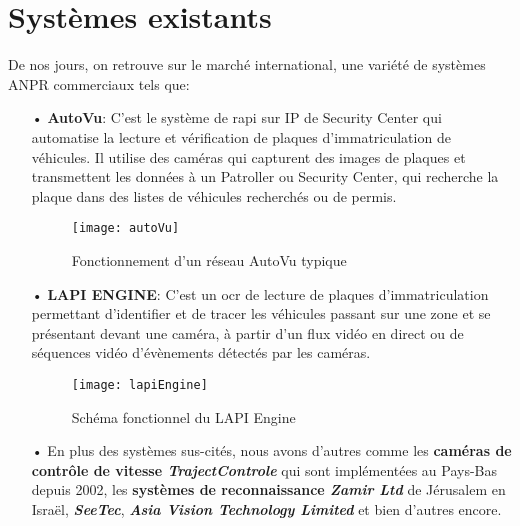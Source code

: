 \section{Systèmes existants}
De nos jours, on retrouve sur le marché international, une variété de systèmes ANPR commerciaux tels que:
    \begin{itemize}
        \item[•]\textbf{AutoVu}: C’est le système de \acrfull{rapi} sur IP de Security Center qui automatise la lecture et vérification de plaques d'immatriculation de véhicules. Il utilise des caméras qui capturent des images de plaques et transmettent les données à un Patroller ou Security Center, qui recherche la plaque dans des listes de véhicules recherchés ou de permis. \cite{autoVu}
            \begin{figure}[H]
                \centering
                \texttt{[image: autoVu]}
                \caption{Fonctionnement d'un réseau AutoVu typique}
            \end{figure}  
        \item[•]\textbf{LAPI ENGINE}: C’est un \acrshort{ocr} de lecture de plaques d'immatriculation permettant d'identifier et de tracer les véhicules passant sur une zone et se présentant devant une caméra, à partir d'un flux vidéo en direct ou de séquences vidéo d'évènements détectés par les caméras. \cite{lapiWeb}
        \begin{figure}[H]
            \centering
            \texttt{[image: lapiEngine]}
            \caption{Schéma fonctionnel du LAPI Engine \cite{lapiManual}}
        \end{figure} 
        \item[•] En plus des systèmes sus-cités, nous avons d'autres comme les \textbf{caméras de contrôle de vitesse \textit{TrajectControle}} qui sont implémentées au Pays-Bas depuis 2002, les \textbf{systèmes de reconnaissance \textit{Zamir Ltd}} de Jérusalem en Israël, \textbf{\textit{SeeTec}}, \textbf{\textit{Asia Vision Technology Limited}} et bien d'autres encore. \cite{HindeThesis} \cite{NorMaster}
    \end{itemize} 
    